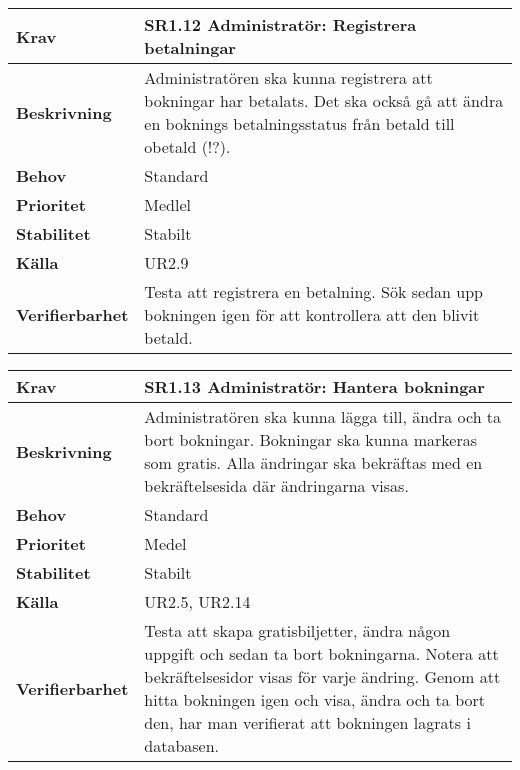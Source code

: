 \documentclass[a4paper, twoside, 11pt, titlepage]{article}
\begin{document}
		\begin{tabular} { p{2.6cm} p{12.5cm} }
			\hline
			\sffamily\textbf{Krav} & \sffamily\textbf{SR1.12 Administratör: Registrera betalningar } \\
			\hline
			\sffamily\textbf{Beskrivning} & Administratören ska kunna registrera att bokningar har betalats. Det ska också gå att ändra en boknings betalningsstatus från betald till obetald (!?).  \\
			\hline
			\sffamily\textbf{Behov} & Standard  \\
			\hline
			\sffamily\textbf{Prioritet} & Medlel  \\
			\hline
			\sffamily\textbf{Stabilitet} & Stabilt  \\
			\hline
			\sffamily\textbf{Källa} & UR2.9  \\
			\hline
			\sffamily\textbf{Verifierbarhet} & Testa att registrera en betalning. Sök sedan upp bokningen igen för att kontrollera att den blivit betald.  \\
			\hline
		\end{tabular}
		\vspace{6mm}

		\begin{tabular} { p{2.6cm} p{12.5cm} }
			\hline
			\sffamily\textbf{Krav} & \sffamily\textbf{SR1.13 Administratör: Hantera bokningar } \\
			\hline
			\sffamily\textbf{Beskrivning} & Administratören ska kunna lägga till, ändra och ta bort bokningar. Bokningar ska kunna markeras som gratis. Alla ändringar ska bekräftas med en bekräftelsesida där ändringarna visas.  \\
			\hline
			\sffamily\textbf{Behov} & Standard  \\
			\hline
			\sffamily\textbf{Prioritet} & Medel  \\
			\hline
			\sffamily\textbf{Stabilitet} & Stabilt  \\
			\hline
			\sffamily\textbf{Källa} & UR2.5, UR2.14  \\
			\hline
			\sffamily\textbf{Verifierbarhet} & Testa att skapa gratisbiljetter, ändra någon uppgift och sedan ta bort bokningarna. Notera att bekräftelsesidor visas för varje ändring. Genom att hitta bokningen igen och visa, ändra och ta bort den, har man verifierat att bokningen lagrats i databasen.  \\
			\hline
		\end{tabular}
		\vspace{6mm}
\end{document}

